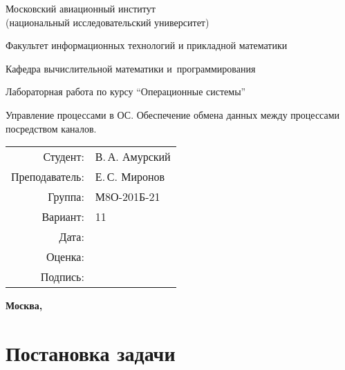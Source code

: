 \documentclass[pdf, unicode, 12pt, a4paper,oneside,fleqn]{article}
\begin{document}
\begin{titlepage}
    \begin{center}
        \bfseries

        {\Large Московский авиационный институт\\ (национальный исследовательский университет)}
        
        \vspace{48pt}
        
        {\large Факультет информационных технологий и прикладной математики}
        
        \vspace{36pt}
        
        {\large Кафедра вычислительной математики и~программирования}
        
        \vspace{48pt}
        
        Лабораторная работа  по курсу \enquote{Операционные системы}

        \vspace{48pt}

        Управление процессами в ОС. Обеспечение обмена данных между процессами посредством каналов.
    \end{center}
    
    \vspace{140pt}
    
    \begin{flushright}
    \begin{tabular}{rl}
    Студент: & В.\,А. Амурский \\
    Преподаватель: & Е.\,С. Миронов \\
    Группа: & М8О-201Б-21 \\
    Вариант: & 11 \\
    Дата: & \\
    Оценка: & \\
    Подпись: & \\
    \end{tabular}
    \end{flushright}
    
    \vfill
    
    \begin{center}
    \bfseries
    Москва, \the\year
    \end{center}
\end{titlepage}
    
\pagebreak

\section{Постановка задачи}
\end{document}
